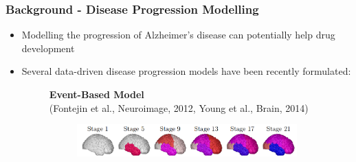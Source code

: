 \begin{frame}
\frametitle{Background - Disease Progression Modelling}

\newcommand{\mnpHeight}{3cm}

\vspace{-3em}
\begin{itemize}
  \item Modelling the progression of Alzheimer's disease can potentially help drug development
  \item Several data-driven disease progression models have been recently formulated:
  
  
  \hspace{-2em}
  \begin{small}
  \begin{figure}[h]
  \centering
    \begin{minipage}[t][\mnpHeight][t]{0.49\linewidth}
   \centering
    \textbf{Event-Based Model}\\ \footnotesize{(Fontejin et al., Neuroimage, 2012, Young et al., Brain, 2014)}\\    %
    \begin{subfigure}{0.57\textwidth}
    \vspace{-9em}
    \includegraphics[width=\textwidth,trim=0 0 450 0,clip]{young_progression2}
    

\end{subfigure}
\end{minipage}
\end{figure}
\end{small}
\end{itemize}
\end{frame}
